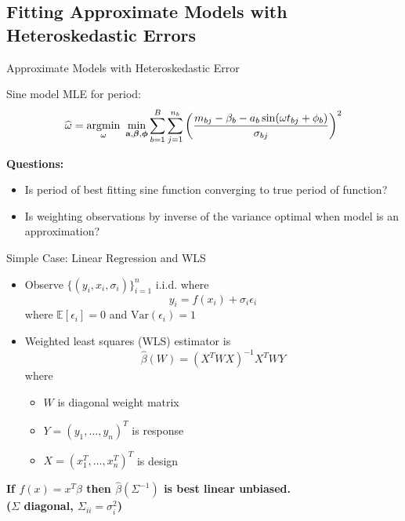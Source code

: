 \documentclass[12pt]{beamer}
\newcommand{\argmin}[1]{\underset{#1}{\operatorname{argmin}}\text{ }}
\newcommand{\Var}{\text{Var}}
\newcommand{\E}{\mathbb{E}}
\newcommand{\V}[1]{{\bm{\mathbf{\MakeLowercase{#1}}}}} %
\begin{document}
\subsection{Fitting Approximate Models with Heteroskedastic Errors}

\begin{frame}{Approximate Models with Heteroskedastic Error}

  Sine model MLE for period:
  \begin{equation*}
    \widehat{\omega} = \argmin{\omega} \min_{\V{a},\V{\beta},\V{\phi}} \sum_{b=1}^B \sum_{j=1}^{n_b} \left(\frac{m_{bj} - \beta_{b} - a_b\sin(\omega t_{bj} + \phi_b)}{\sigma_{bj}}\right)^2
  \end{equation*}
  
  
  

  \textbf{Questions:}
  \begin{itemize}
  \item Is period of best fitting sine function converging to true period of function?\\
  \item Is weighting observations by inverse of the variance optimal when model is an approximation?
  \end{itemize}
  
\end{frame}

\begin{frame}{Simple Case: Linear Regression and WLS}
\begin{itemize}
\item Observe $\{(y_i,x_i,\sigma_i)\}_{i=1}^n$ i.i.d. where
  \begin{equation*}
    y_i = f(x_i) + \sigma_i\epsilon_i 
  \end{equation*}
  where $\E[\epsilon_i] = 0$  and $\Var(\epsilon_i) = 1$
\item Weighted least squares (WLS) estimator is
  \begin{equation*}
    \widehat{\beta}(W) = (X^TWX)^{-1}X^TWY
  \end{equation*}
  where
  \begin{itemize}
    \item $W$ is diagonal weight matrix
    \item $Y = (y_1,\ldots,y_n)^T$ is response
    \item $X = (x_1^T,\ldots,x_n^T)^T$ is design
  \end{itemize}
\end{itemize}

\begin{center}
\textbf{If $f(x) = x^T\beta$ then $\widehat{\beta}(\Sigma^{-1})$ is best linear unbiased.\\ ($\Sigma$ diagonal, $\Sigma_{ii} = \sigma_i^2$)}
\end{center}
\end{frame}
\end{document}
